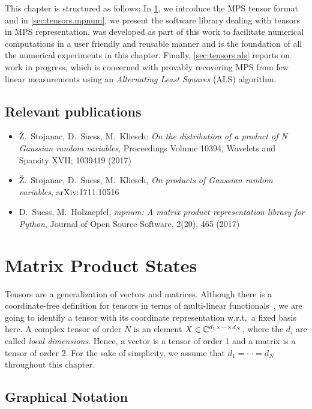 This chapter is structured as follows:
In \cref{sec:tensors.mps}, we introduce the MPS tensor format and in \cref{sec:tensors.mpnum}, we present the software library \mpnum{} dealing with tensors in MPS representation.
\mpnum{} was developed as part of this work to facilitate numerical computations in a user friendly and reusable manner and is the foundation of all the numerical experiments in this chapter.
Finally, \cref{sec:tensors.als} reports on work in progress, which is concerned with provably recovering MPS from few linear measurements using an \emph{Alternating Least Squares} (ALS) algorithm.


\subsection*{Relevant publications}
\begin{itemize}
  \item Ž.\ Stojanac, D.\ Suess, M.\ Kliesch: \textit{On the distribution of a product of N Gaussian random variables}, Proceedings Volume 10394, Wavelets and Sparsity XVII; 1039419 (2017)
  \item Ž.\ Stojanac, D.\ Suess, M.\ Kliesch, \textit{On products of Gaussian random variables}, arXiv:1711.10516
  \item D.\ Suess, M.\ Holzaepfel, \textit{mpnum: A matrix product representation library for Python}, Journal of Open Source Software, 2(20), 465 (2017)
\end{itemize}
\section{Matrix Product States}%
\label{sec:tensors.mps}

Tensors are a generalization of vectors and matrices.
Although there is a coordinate-free definition for tensors in terms of multi-linear functionals~\cite{Browder_2012_Mathematical}, we are going to identify a tensor with its coordinate representation w.r.t.\ a fixed basis here.
A complex tensor of order $N$ is an element $X \in {\mathbb{C}}^{d_1 \times \cdots \times d_N}$, where the $d_i$ are called \emph{local dimensions}.
Hence, a vector is a tensor of order 1 and a matrix is a tensor of order 2.
For the sake of simplicity, we assume that $d_1 = \cdots = d_N$ throughout this chapter.



\subsection{Graphical Notation}%
\label{sub:mps.graphical_notation}

